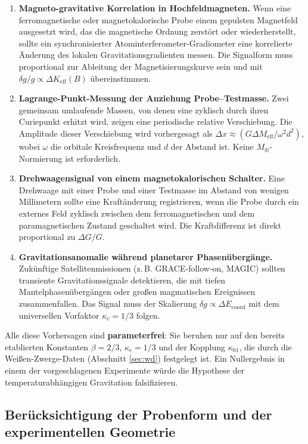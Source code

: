 \documentclass[12pt]{article}
\theoremstyle{remark}
\begin{document}
	\begin{enumerate}
		\item \textbf{Magneto-gravitative Korrelation in Hochfeldmagneten.}
		Wenn eine ferromagnetische oder magnetokalorische Probe einem gepulsten Magnetfeld ausgesetzt wird, das die magnetische Ordnung zerstört oder wiederherstellt, sollte ein synchronisierter Atominterferometer-Gradiometer eine korrelierte Änderung des lokalen Gravitationsgradienten messen. Die Signalform muss proportional zur Ableitung der Magnetisierungskurve sein und mit $\delta g/g \propto \Delta K_{\mathrm{eff}}(B)$ übereinstimmen.
		\item \textbf{Lagrange-Punkt-Messung der Anziehung Probe–Testmasse.}
		Zwei gemeinsam umlaufende Massen, von denen eine zyklisch durch ihren Curiepunkt erhitzt wird, zeigen eine periodische relative Verschiebung. Die Amplitude dieser Verschiebung wird vorhergesagt als $\Delta x \approx (G \Delta M_{\mathrm{eff}} / \omega^2 d^2)$, wobei $\omega$ die orbitale Kreisfrequenz und $d$ der Abstand ist. Keine $M_\oplus$-Normierung ist erforderlich.
		\item \textbf{Drehwaagensignal von einem magnetokalorischen Schalter.}
		Eine Drehwaage mit einer Probe und einer Testmasse im Abstand von wenigen Millimetern sollte eine Kraftänderung registrieren, wenn die Probe durch ein externes Feld zyklisch zwischen dem ferromagnetischen und dem paramagnetischen Zustand geschaltet wird. Die Kraftdifferenz ist direkt proportional zu $\Delta G/G$.
		\item \textbf{Gravitationsanomalie während planetarer Phasenübergänge.}
		Zukünftige Satellitenmissionen (z. B. GRACE‑follow‑on, MAGIC) sollten transiente Gravitationssignale detektieren, die mit tiefen Mantelphasenübergängen oder großen magmatischen Ereignissen zusammenfallen. Das Signal muss der Skalierung $\delta g \propto \Delta E_{\mathrm{coord}}$ mit dem universellen Vorfaktor $\kappa_c = 1/3$ folgen.
	\end{enumerate}
	
	Alle diese Vorhersagen sind \textbf{parameterfrei}: Sie beruhen nur auf den bereits etablierten Konstanten $\beta = 2/3$, $\kappa_c = 1/3$ und der Kopplung $\kappa_{01}$, die durch die Weißen-Zwerge-Daten (Abschnitt \ref{sec:wd}) festgelegt ist. Ein Nullergebnis in einem der vorgeschlagenen Experimente würde die Hypothese der temperaturabhängigen Gravitation falsifizieren.
	
	\subsection{Berücksichtigung der Probenform und der experimentellen Geometrie}
	\label{subsec:lab-geometry}
	
\end{document}
